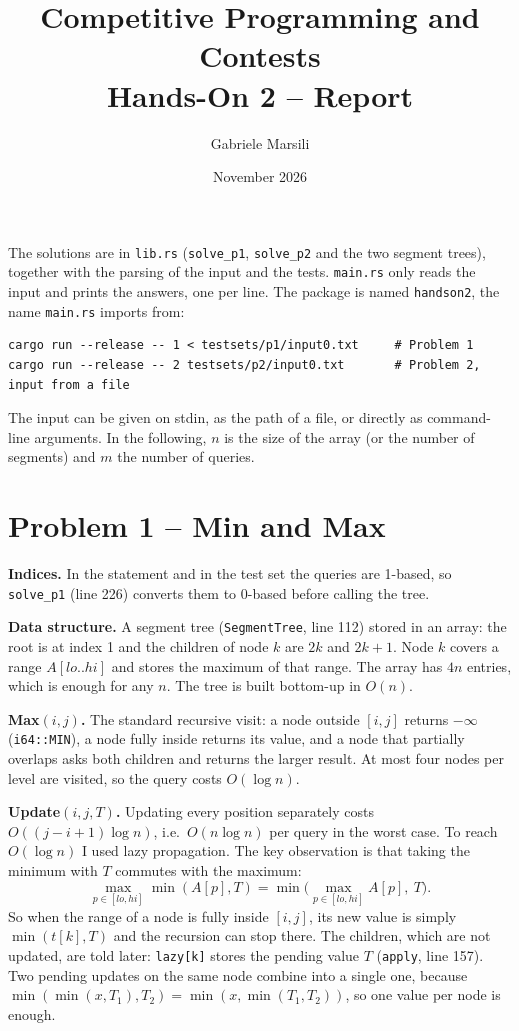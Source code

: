 \documentclass[11pt,a4paper]{article}
\title{Competitive Programming and Contests\\Hands-On 2 -- Report}
\author{Gabriele Marsili}
\date{November 2026}
\begin{document}
\sloppy
\maketitle

The solutions are in \texttt{lib.rs} (\texttt{solve\_p1}, \texttt{solve\_p2} and the two segment trees),
together with the parsing of the input and the tests. \texttt{main.rs} only reads the input and prints the
answers, one per line. The package is named \texttt{handson2}, the name \texttt{main.rs} imports from:
\begin{lstlisting}
cargo run --release -- 1 < testsets/p1/input0.txt     # Problem 1
cargo run --release -- 2 testsets/p2/input0.txt       # Problem 2, input from a file
\end{lstlisting}
The input can be given on stdin, as the path of a file, or directly as command-line arguments. In the
following, $n$ is the size of the array (or the number of segments) and $m$ the number of queries.

\section*{Problem 1 -- Min and Max}

\textbf{Indices.} In the statement and in the test set the queries are 1-based, so \texttt{solve\_p1}
(line 226) converts them to 0-based before calling the tree.

\textbf{Data structure.} A segment tree (\texttt{SegmentTree}, line 112) stored in an array: the root is at
index 1 and the children of node $k$ are $2k$ and $2k+1$. Node $k$ covers a range $A[lo..hi]$ and stores the
maximum of that range. The array has $4n$ entries, which is enough for any $n$. The tree is built bottom-up
in $O(n)$.

\textbf{Max$(i,j)$.} The standard recursive visit: a node outside $[i,j]$ returns $-\infty$ (\texttt{i64::MIN}),
a node fully inside returns its value, and a node that partially overlaps asks both children and returns the
larger result. At most four nodes per level are visited, so the query costs $O(\log n)$.

\textbf{Update$(i,j,T)$.} Updating every position separately costs $O((j-i+1)\log n)$, i.e.\ $O(n \log n)$
per query in the worst case. To reach $O(\log n)$ I used lazy propagation. The key observation is that
taking the minimum with $T$ commutes with the maximum:
\[ \max_{p \in [lo,hi]} \min(A[p], T) = \min\Big(\max_{p \in [lo,hi]} A[p],\ T\Big). \]
So when the range of a node is fully inside $[i,j]$, its new value is simply $\min(t[k], T)$ and the
recursion can stop there. The children, which are not updated, are told later: \texttt{lazy[k]} stores the
pending value $T$ (\texttt{apply}, line 157). Two pending updates on the same node combine into a single one,
because $\min(\min(x, T_1), T_2) = \min(x, \min(T_1, T_2))$, so one value per node is enough.
\end{document}
